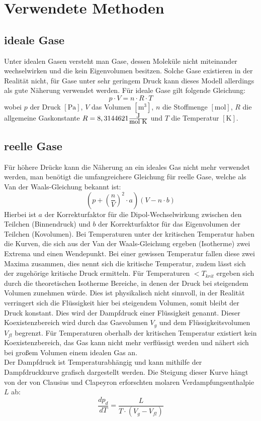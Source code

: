 \section{Verwendete Methoden}
\subsection{ideale Gase}
Unter idealen Gasen versteht man Gase, dessen Moleküle nicht miteinander wechselwirken und die kein Eigenvolumen besitzen. Solche Gase existieren in der Realität nicht, für Gase unter sehr geringem Druck kann dieses Modell allerdings als gute Näherung verwendet werden. Für ideale Gase gilt folgende Gleichung:
\begin{equation}
p \cdot V = n \cdot R \cdot T
\end{equation}
wobei $p$ der Druck $[\mathrm{Pa}]$, $V$ das Volumen $[\mathrm{m^3}]$, $n$ die Stoffmenge $[\mathrm{mol}]$, $R$ die allgemeine Gaskonstante $R=8,3144621 \frac{\text{\fontsize{9}{1}\selectfont {J}}}{\text{\fontsize{9}{1}\selectfont {mol K}}}$ und $T$ die Temperatur $[\mathrm{K}]$.
\subsection{reelle Gase}
Für höhere Drücke kann die Näherung an ein ideales Gas nicht mehr verwendet werden, man benötigt die umfangreichere Gleichung für reelle Gase, welche als Van der Waals-Gleichung bekannt ist:
\begin{equation}
(p+\left(\frac{n}{V}\right)^2 \cdot a)(V - n \cdot b)
\end{equation}
Hierbei ist $a$ der Korrekturfaktor für die Dipol-Wechselwirkung zwischen den Teilchen (Binnendruck) und $b$ der Korrekturfaktor für das Eigenvolumen der Teilchen (Kovolumen). Bei Temperaturen unter der kritischen Temperatur haben die Kurven, die sich aus der Van der Waals-Gleichung ergeben (Isotherme) zwei Extrema und einen Wendepunkt. Bei einer gewissen Temperatur fallen diese zwei Maxima zusammen, dies nennt sich die kritische Temperatur, zudem lässt sich der zugehörige kritische Druck ermitteln. Für Temperaturen $< T_{krit}$ ergeben sich durch die theoretischen Isotherme Bereiche, in denen der Druck bei steigendem Volumen zunehmen würde. Dies ist physikalisch nicht sinnvoll, in der Realität verringert sich die Flüssigkeit hier bei steigendem Volumen, somit bleibt der Druck konstant. Dies wird der Dampfdruck einer Flüssigkeit genannt. Dieser Koexistenzbereich wird durch das Gasvolumen $V_g$ und dem Flüssigkeitsvolumen $V_{fl}$ begrenzt. Für Temperaturen oberhalb der kritischen Temperatur existiert kein Koexistenzbereich, das Gas kann nicht mehr verflüssigt werden und nähert sich bei großem Volumen einem idealen Gas an.\\
Der Dampfdruck ist Temperaturabhängig und kann mithilfe der Dampfdruckkurve grafisch dargestellt werden. Die Steigung dieser Kurve hängt von der von Clausius und Clapeyron erforschten molaren Verdampfungsenthalpie $L$ ab:
\begin{equation}
\frac{dp_d}{dT} = \frac{L}{T \cdot (V_g-V_{fl})}
\end{equation}

